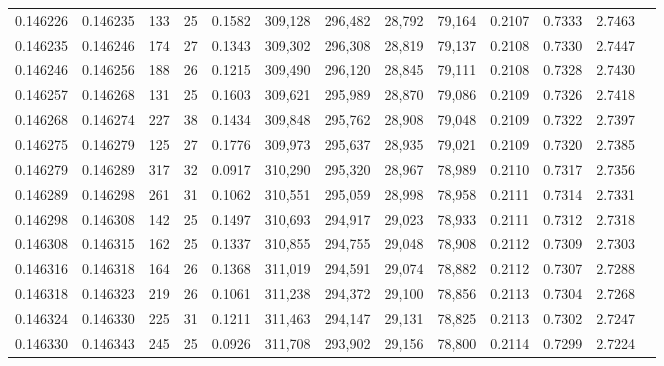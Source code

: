 \begin{tabular}{rrrrrrrrrrrrr}
0.146226 & 0.146235 & 133 &  25 &                                     0.1582 & 309,128 & 296,482 &  28,792 &  79,164 & 0.2107 & 0.7333 & 2.7463 \\
0.146235 & 0.146246 & 174 &  27 &                                     0.1343 & 309,302 & 296,308 &  28,819 &  79,137 & 0.2108 & 0.7330 & 2.7447 \\
0.146246 & 0.146256 & 188 &  26 &                                     0.1215 & 309,490 & 296,120 &  28,845 &  79,111 & 0.2108 & 0.7328 & 2.7430 \\
0.146257 & 0.146268 & 131 &  25 &                                     0.1603 & 309,621 & 295,989 &  28,870 &  79,086 & 0.2109 & 0.7326 & 2.7418 \\
0.146268 & 0.146274 & 227 &  38 &                                     0.1434 & 309,848 & 295,762 &  28,908 &  79,048 & 0.2109 & 0.7322 & 2.7397 \\
0.146275 & 0.146279 & 125 &  27 &                                     0.1776 & 309,973 & 295,637 &  28,935 &  79,021 & 0.2109 & 0.7320 & 2.7385 \\
0.146279 & 0.146289 & 317 &  32 &                                     0.0917 & 310,290 & 295,320 &  28,967 &  78,989 & 0.2110 & 0.7317 & 2.7356 \\
0.146289 & 0.146298 & 261 &  31 &                                     0.1062 & 310,551 & 295,059 &  28,998 &  78,958 & 0.2111 & 0.7314 & 2.7331 \\
0.146298 & 0.146308 & 142 &  25 &                                     0.1497 & 310,693 & 294,917 &  29,023 &  78,933 & 0.2111 & 0.7312 & 2.7318 \\
0.146308 & 0.146315 & 162 &  25 &                                     0.1337 & 310,855 & 294,755 &  29,048 &  78,908 & 0.2112 & 0.7309 & 2.7303 \\
0.146316 & 0.146318 & 164 &  26 &                                     0.1368 & 311,019 & 294,591 &  29,074 &  78,882 & 0.2112 & 0.7307 & 2.7288 \\
0.146318 & 0.146323 & 219 &  26 &                                     0.1061 & 311,238 & 294,372 &  29,100 &  78,856 & 0.2113 & 0.7304 & 2.7268 \\
0.146324 & 0.146330 & 225 &  31 &                                     0.1211 & 311,463 & 294,147 &  29,131 &  78,825 & 0.2113 & 0.7302 & 2.7247 \\
0.146330 & 0.146343 & 245 &  25 &                                     0.0926 & 311,708 & 293,902 &  29,156 &  78,800 & 0.2114 & 0.7299 & 2.7224 \\

\end{tabular}
